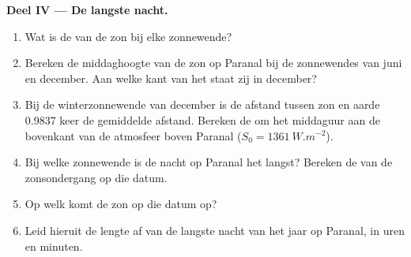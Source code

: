\begin{problem}
\medskip
\noindent\textbf{Deel IV --- De langste nacht.}
\begin{enumerate}[resume]
  \item Wat is de  van de zon bij elke zonnewende?
  \item Bereken de middaghoogte van de zon op Paranal bij de zonnewendes van juni
        en december. Aan welke kant van het  staat zij in december?
  \item Bij de winterzonnewende van december is de afstand tussen zon en aarde
        0.9837 keer de gemiddelde afstand. Bereken de  om het middaguur
        aan de bovenkant van de atmosfeer boven Paranal
        ($S_0 = \qty{1361}{W.m^{-2}}$).
  \item Bij welke zonnewende is de nacht op Paranal het langst? Bereken de
         van de zonsondergang op die datum.
  \item Op welk  komt de zon op die datum op?
  \item Leid hieruit de lengte af van de langste nacht van het jaar op Paranal, in
        uren en minuten.
\end{enumerate}
\end{problem}

